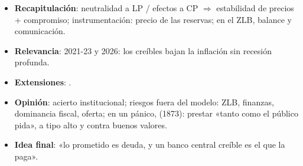 \documentclass{article}
\begin{document}
\begin{columnas}
\begin{itemize}
\item \textbf{Recapitulación}: neutralidad a LP / efectos a CP $\Rightarrow$ estabilidad de precios + compromiso; instrumentación: precio de las reservas; en el ZLB, balance y comunicación.
\item \textbf{Relevancia}: 2021-23 y 2026: los creíbles bajan la inflación sin recesión profunda.
\item \textbf{Extensiones}:      .
\item \textbf{Opinión}: acierto institucional; riesgos fuera del modelo: ZLB, finanzas, dominancia fiscal, oferta; en un pánico,  (1873): prestar «tanto como el público pida», a tipo alto y contra buenos valores.
\item \textbf{Idea final}: «lo prometido es deuda, y un banco central creíble es el que la paga».
\end{itemize}


\end{columnas}
\end{document}
